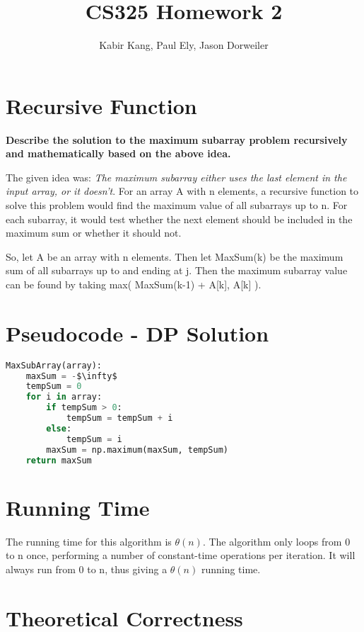 \documentclass[a4paper,12pt]{article}
\title{CS325 Homework 2}
\author{Kabir Kang, Paul Ely, Jason Dorweiler}
\begin{document}
\maketitle

\section*{Recursive Function}
\textbf{Describe the solution to the maximum subarray problem recursively and mathematically based on the above idea.}

The given idea was: \emph{The maximum subarray either uses the last element in the input array, or it doesn't}. For an array A with n elements, a recursive function to solve this problem would find the maximum value of all subarrays up to n. For each subarray, it would test whether the next element should be included in the maximum sum or whether it should not.

So, let A be an array with n elements. Then let MaxSum(k) be the maximum sum of all subarrays up to and ending at j. Then the maximum subarray value can be found by taking max( MaxSum(k-1) + A[k], A[k] ).



\section*{Pseudocode - DP Solution}
  \begin{lstlisting}[language=python,caption={pseudo code for DP algorithm},mathescape]
MaxSubArray(array):
    maxSum = -$\infty$
    tempSum = 0
    for i in array:
    	if tempSum > 0:
    		tempSum = tempSum + i
    	else:
    		tempSum = i
    	maxSum = np.maximum(maxSum, tempSum)
    return maxSum	
  \end{lstlisting}


\section*{Running Time}

The running time for this algorithm is $\theta(n)$. The algorithm only loops from 0 to n once, performing a number of constant-time operations per iteration. It will always run from 0 to n, thus giving a $\theta(n)$ running time.

\section*{Theoretical Correctness}
\end{document}
